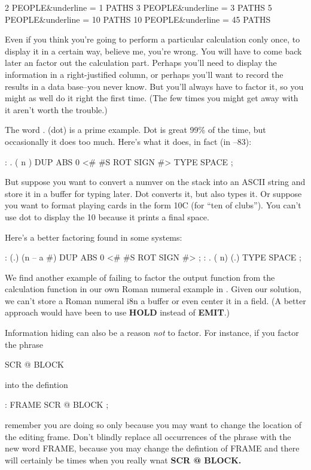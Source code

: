 \begin{Code}[commandchars=\&\{\}]
2 PEOPLE&underline{ = 1 PATHS}
3 PEOPLE&underline{ = 3 PATHS}
5 PEOPLE&underline{ = 10 PATHS}
10 PEOPLE&underline{ = 45 PATHS}
\end{Code}
Even if you think you're going to perform a particular calculation conly once, to display it in a certain way, believe me, you're wrong. You will have to come back later an factor out the calculation part. Perhaps you'll need to display the information in a right-justified column, or perhaps you'll want to record the results in a data base--you never know. But you'll always have to factor it, so you might as well do it right the first time. (The few times you might get away with it aren't worth the trouble.)

The word . (dot) is a prime example. Dot is great 99\% of the time, but occasionally it does too much. Here's what it does, in fact (in \Forth{}--83):

\begin{Code}
: .   ( n )  DUP ABS 0 <# #S  ROT SIGN  #> TYPE SPACE ;
\end{Code}
But suppose you want to convert a numver on the stack into an ASCII string and store it in a buffer for typing later. Dot converts it, but also types it. Or suppose you want to format playing cards in the form 10C (for ``ten of clubs''). You can't use dot to display the 10 because it prints a final space.

Here's a better factoring found in some \Forth{} systems:

\begin{Code}
: (.)  (n -- a #)  DUP ABS 0  <# #S  ROT SIGN  #> ;
: .  ( n)  (.) TYPE SPACE ;
\end{Code}
We find another example of failing to factor the output function from the calculation function in our own Roman numeral example in . Given our solution, we can't store a Roman numeral i8n a buffer or even center it in a field. (A better approach would have been to use \textbf{HOLD} instead of \textbf{EMIT}.)

Information hiding can also be a reason \emph{not} to factor. For instance, if you factor the phrase

\begin{Code}
SCR @ BLOCK
\end{Code}
into the defintion

\begin{Code}
: FRAME   SCR @ BLOCK ;
\end{Code}
remember you are doing so only because you may want to change the location of the editing frame. Don't blindly replace all occurrences of the phrase with the new word FRAME, because you may change the defintion of FRAME and there will certainly be times when you really wnat \textbf{SCR @ BLOCK.}

